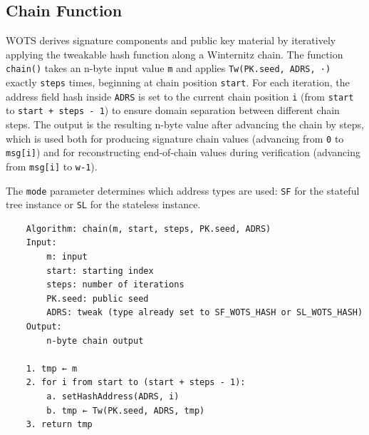 \subsection{Chain Function}
WOTS derives signature components and public key material by iteratively applying the tweakable hash function along a Winternitz chain. The function \texttt{chain()} takes an n-byte input value \texttt{m} and applies \texttt{Tw(PK.seed, ADRS, ·)} exactly \texttt{steps} times, beginning at chain position \texttt{start}. For each iteration, the address field hash inside \texttt{ADRS} is set to the current chain position \texttt{i} (from \texttt{start} to \texttt{start + steps - 1}) to ensure domain separation between different chain steps. The output is the resulting n-byte value after advancing the chain by steps, which is used both for producing signature chain values (advancing from \texttt{0} to \texttt{msg[i]}) and for reconstructing end-of-chain values during verification (advancing from \texttt{msg[i]} to \texttt{w-1}).

The \texttt{mode} parameter determines which address types are used: \texttt{SF} for the stateful tree instance or \texttt{SL} for the stateless instance.
\begin{verbatim}
    Algorithm: chain(m, start, steps, PK.seed, ADRS)
    Input:
        m: input
        start: starting index
        steps: number of iterations
        PK.seed: public seed
        ADRS: tweak (type already set to SF_WOTS_HASH or SL_WOTS_HASH)
    Output:
        n-byte chain output

    1. tmp ← m
    2. for i from start to (start + steps - 1):
        a. setHashAddress(ADRS, i)
        b. tmp ← Tw(PK.seed, ADRS, tmp)
    3. return tmp
\end{verbatim}

